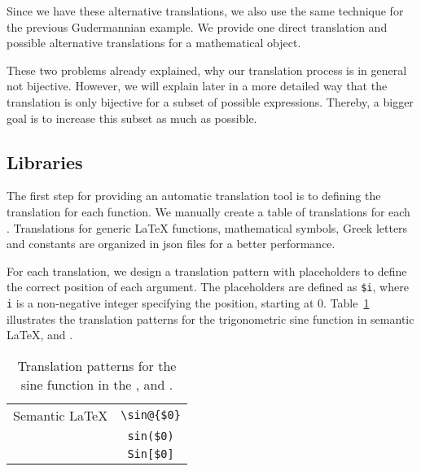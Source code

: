 Since we have these alternative translations, we also use the same technique for the previous Gudermannian example. We provide one direct translation and possible alternative translations for a mathematical object.

These two problems already explained, why our translation process is in general not bijective. However, we will explain later in a more detailed way that the translation is only bijective for a subset of possible expressions. Thereby, a bigger goal is to increase this subset as much as possible.

\subsection{Libraries}\label{subsec:libs}
The first step for providing an automatic translation tool is to defining the translation for each function. We manually create a table of translations for each \Macro. Translations for generic \LaTeX{} functions, mathematical symbols, Greek letters and constants are organized in \gls{json} files for a better performance.
 
For each translation, we design a translation pattern with placeholders to define the correct position of each argument. The placeholders are defined as \verb|$i|, where \verb|i| is a non-negative integer specifying the position, starting at $0$. Table~\ref{tab:placeholder_ex1} illustrates the translation patterns for the trigonometric sine function in semantic \LaTeX, \Maple{} and \Mathematica.
\begin{table}[ht]
	\centering
	\begin{tabular}{lc}
		\hline
		Semantic \LaTeX & \verb|\sin@{$0}| \\
		\Maple & \verb|sin($0)| \\
		\Mathematica & \verb|Sin[$0]|\\
		\hline
	\end{tabular}
	\caption{Translation patterns for the sine function in the \DLMF, \Maple{} and \Mathematica.}
	\label{tab:placeholder_ex1}
\end{table}

